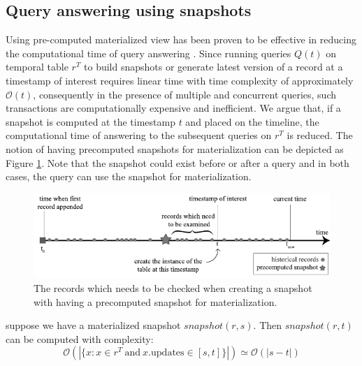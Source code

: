 		\subsection{Query answering using snapshots} \label{sec:query_using_snapshots}
			Using pre-computed materialized view has been proven to be effective in reducing the computational time of query answering \cite{sohrabi2016materialized} \cite{du2017deepsea}. Since running queries $Q(t)$ on temporal table $r^T$ to build snapshots or generate latest version of a record at a timestamp of interest requires linear time with time complexity of approximately $\mathcal{O}(t)$, consequently in the presence of multiple and concurrent queries, such transactions are computationally expensive and inefficient. We argue that, if a snapshot is computed at the timestamp $t$ and placed on the timeline, the computational time of answering to the subsequent queries on $r^T$ is reduced. The notion of having precomputed snapshots for materialization can be depicted as Figure \ref{fig:snapshot_materialization}. Note that the snapshot could exist before or after a query and in both cases, the query can use the snapshot for materialization.

			\begin{figure}[t]
				\centering
				\includegraphics[width=\textwidth]{figs/snapshot_materialization.pdf}
				\caption{The records which needs to be checked when creating a snapshot with having a precomputed snapshot for materialization.}
				\label{fig:snapshot_materialization}
			\end{figure}

			\begin{prop}
				suppose we have a materialized snapshot $snapshot(r,s)$. Then $snapshot(r,t)$ can be computed with complexity:
				$$\mathcal{O}(|\{x: x\in r^T\mathrm{\ and\ } x.\mathrm{updates} \in [s,t]\}|) \simeq \mathcal{O}(|s-t|)$$
			\label{prop:materialized_snapshot_complexity}
			\end{prop}


